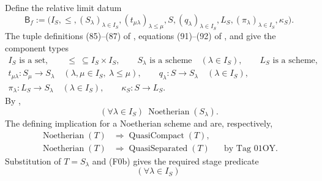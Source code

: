 \begin{definition}
  \label{def:nagata-final-descended-model}
  \checked{}

  Define the relative limit datum
  \[
    \mathsf B_f
      :=\bigl(
        I_S,\leq,(S_\lambda)_{\lambda\in I_S},
        (t_{\mu\lambda})_{\lambda\leq\mu},
        S,(q_\lambda)_{\lambda\in I_S},
        L_S,(\pi_\lambda)_{\lambda\in I_S},\kappa_S
        \bigr).                                                    \tag{F0}
  \]
  The tuple definitions (85)--(87) of
  , equations (91)--(92) of
  , and
   give the component types
  \[
  \begin{gathered}
    I_S\text{ is a set},\qquad
    {\leq}\ \subseteq I_S\times I_S,\qquad
    S_\lambda\text{ is a scheme}\quad(\lambda\in I_S),\qquad
    L_S\text{ is a scheme},\\
    t_{\mu\lambda}\colon S_\mu\to S_\lambda
      \quad(\lambda,\mu\in I_S,\ \lambda\leq\mu),\qquad
    q_\lambda\colon S\to S_\lambda\quad(\lambda\in I_S),\\
    \pi_\lambda\colon L_S\to S_\lambda\quad(\lambda\in I_S),\qquad
    \kappa_S\colon S\to L_S.
  \end{gathered}                                                    \tag{F0a}
  \]
  By ,
  \[
    (\forall\lambda\in I_S)\
      \operatorname{Noetherian}(S_\lambda).                       \tag{F0b}
  \]
  The defining implication for a Noetherian scheme and
  \cite[\href{https://stacks.math.columbia.edu/tag/01OY}{Tag 01OY}]
    {stacks-project} are, respectively,
  \[
  \begin{aligned}
    \operatorname{Noetherian}(T)
      &\Longrightarrow\operatorname{QuasiCompact}(T),\\
    \operatorname{Noetherian}(T)
      &\Longrightarrow\operatorname{QuasiSeparated}(T)
        &&\text{by Tag 01OY}.
  \end{aligned}
  \]
  Substitution of $T=S_\lambda$ and (F0b) gives the required stage predicate
  \[
    (\forall\lambda\in I_S)\
\]
\end{definition}

